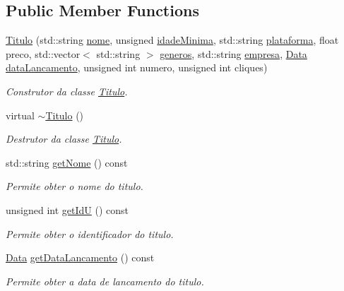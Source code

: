 \subsection*{Public Member Functions}
\begin{DoxyCompactItemize}
\item 
\hyperlink{classTitulo_a898faeefdad15c64ae4cdc904a7e6f0e}{Titulo} (std\+::string \hyperlink{classTitulo_a8abdf1fc6d4fc14be20bbec247664d83}{nome}, unsigned \hyperlink{classTitulo_a28891078f53fc3317de60ae739514955}{idade\+Minima}, std\+::string \hyperlink{classTitulo_a67761eb7f006453ab0869e4b7c0a9c0b}{plataforma}, float preco, std\+::vector$<$ std\+::string $>$ \hyperlink{classTitulo_a3209265c8534416978ee9891b96c14b2}{generos}, std\+::string \hyperlink{classTitulo_a91510c440dc8583d60d88ea02f4eb1b6}{empresa}, \hyperlink{classData}{Data} \hyperlink{classTitulo_ae540ddf2c607eb0e4de29eb8c0cca7f0}{data\+Lancamento}, unsigned int numero, unsigned int cliques)
\begin{DoxyCompactList}\small\item\em Construtor da classe \hyperlink{classTitulo}{Titulo}. \end{DoxyCompactList}\item 
virtual \hyperlink{classTitulo_a9b7513f1c255265a1d6ccff0ead30a8c}{$\sim$\+Titulo} ()
\begin{DoxyCompactList}\small\item\em Destrutor da classe \hyperlink{classTitulo}{Titulo}. \end{DoxyCompactList}\item 
std\+::string \hyperlink{classTitulo_acb79279860b3404c6419697df5f860cb}{get\+Nome} () const
\begin{DoxyCompactList}\small\item\em Permite obter o nome do titulo. \end{DoxyCompactList}\item 
unsigned int \hyperlink{classTitulo_af8fed6503c1c528ac3bfdbb182fce0b6}{get\+IdU} () const
\begin{DoxyCompactList}\small\item\em Permite obter o identificador do titulo. \end{DoxyCompactList}\item 
\hyperlink{classData}{Data} \hyperlink{classTitulo_a1cb9b8c0a9dca73d5925922ccc041fa8}{get\+Data\+Lancamento} () const
\begin{DoxyCompactList}\small\item\em Permite obter a data de lancamento do titulo. \end{DoxyCompactList}\item 

\end{DoxyCompactItemize}
